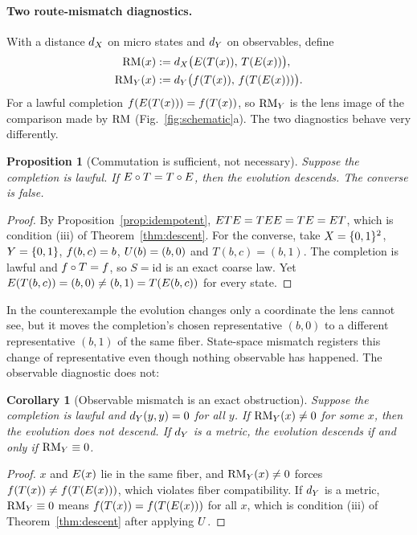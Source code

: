 \documentclass[11pt]{article}
\theoremstyle{plain}
\newtheorem{proposition}[theorem]{Proposition}
\newtheorem{corollary}[theorem]{Corollary}
\theoremstyle{definition}
\theoremstyle{remark}
\newcommand{\RMobs}{\RM_{\ObsSpace}}
\begin{document}
\paragraph{Two route-mismatch diagnostics.}
With a distance $d_{X}$ on micro states and $d_{Y}$ on observables, define
\begin{align}
\RM(x) &:= d_{\StateSpace}\big(\PackageOp(T(x)),\,T(\PackageOp(x))\big), \label{eq:rm_state}\\
\RMobs(x) &:= d_{\ObsSpace}\big(\Lens(T(x)),\,\Lens(T(\PackageOp(x)))\big). \label{eq:rm_obs}
\end{align}
For a lawful completion $f(E(T(x)))=f(T(x))$, so $\RMobs$ is the lens image of the comparison made by $\mathrm{RM}$ (Fig.~\ref{fig:schematic}a). The two diagnostics behave very differently.

\begin{proposition}[Commutation is sufficient, not necessary]\label{prop:commute}
Suppose the completion is lawful. If $E\circ T=T\circ E$, then the evolution descends. The converse is false.
\end{proposition}
\begin{proof}
By Proposition~\ref{prop:idempotent}, $E TE=TEE=TE=E T$, which is condition (iii) of Theorem~\ref{thm:descent}. For the converse, take $X=\{0,1\}^2$, $Y=\{0,1\}$, $f(b,c)=b$, $U(b)=(b,0)$ and $T(b,c)=(b,1)$. The completion is lawful and $f\circ T=f$, so $S=\mathrm{id}$ is an exact coarse law. Yet $E(T(b,c))=(b,0)\neq(b,1)=T(E(b,c))$ for every state.
\end{proof}

In the counterexample the evolution changes only a coordinate the lens cannot see, but it moves the completion's chosen representative $(b,0)$ to a different representative $(b,1)$ of the same fiber. State-space mismatch registers this change of representative even though nothing observable has happened. The observable diagnostic does not:

\begin{corollary}[Observable mismatch is an exact obstruction]\label{cor:obs}
Suppose the completion is lawful and $d_{Y}(y,y)=0$ for all $y$. If $\RMobs(x)\neq0$ for some $x$, then the evolution does not descend. If $d_{Y}$ is a metric, the evolution descends if and only if $\RMobs\equiv0$.
\end{corollary}
\begin{proof}
$x$ and $E(x)$ lie in the same fiber, and $\RMobs(x)\neq0$ forces $f(T(x))\neq f(T(E(x)))$, which violates fiber compatibility. If $d_{Y}$ is a metric, $\RMobs\equiv0$ means $f(T(x))=f(T(E(x)))$ for all $x$, which is condition (iii) of Theorem~\ref{thm:descent} after applying $U$.
\end{proof}
\end{document}
